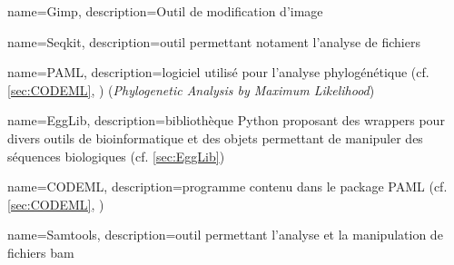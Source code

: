  {
    name=Gimp,
    description={Outil de modification d'image \cite{gimp}}
}
\newcommand{\gimp}{\gls{gimp}}

 {
    name=Seqkit,
    description={outil permettant notament l'analyse de fichiers \fastq\,\cite{seqkit1} \cite{seqkit2}}
}

 {
    name=PAML,
    description={logiciel utilisé pour l'analyse phylogénétique (cf. \cref{sec:CODEML}, \cite{yang_paml_2020}) (\textit{Phylogenetic Analysis by Maximum Likelihood})}
}

 {
    name=EggLib,
    description={bibliothèque \gls{Python} proposant des \glspl{wrapper} pour divers outils de bioinformatique et des objets permettant de manipuler des séquences biologiques (cf. \cref{sec:EggLib}) \cite{siol_egglib_2022}}
}

 {
    name=CODEML,
    description={programme  contenu dans le package \gls{PAML} (cf. \cref{sec:CODEML}, \cite{noauthor_paml-tutorialpositive-selection_nodate})}
}

 {
    name=Samtools,
    description={outil permettant l'analyse et la manipulation de fichiers \gls{bam}}
}



\newcommand{\SNP}{\acrshort{snp}}
\newcommand{\SNPFULL}{\acrfull{snp}}


\newcommand{\TrEx}{\acrshort{TrEx}}

\newcommand{\GeMo}{\acrshort{GeMo}}

\newcommand{\TrMo}{\acrshort{TrMo}}

\newcommand{\OldBam}{\acrshort{oldBAM}}



\newcommand{\ARN}{\acrshort{ARN}}



